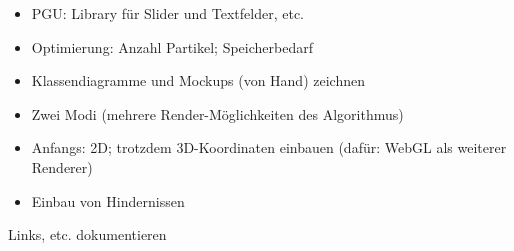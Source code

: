 \vspace*{1cm} 

\begin{itemize}[noitemsep]
\item PGU: Library für Slider und Textfelder, etc.
\item Optimierung: Anzahl Partikel; Speicherbedarf
\item Klassendiagramme und Mockups (von Hand) zeichnen
\item Zwei Modi (mehrere Render-Möglichkeiten des Algorithmus)
\item Anfangs: 2D; trotzdem 3D-Koordinaten einbauen (dafür: WebGL als weiterer Renderer)
\item Einbau von Hindernissen
\end{itemize}


Links, etc. dokumentieren


\vspace*{1cm}
